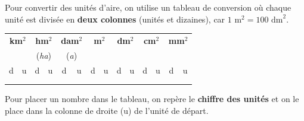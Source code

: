 \documentclass[a4paper]{book}
\begin{document}
    
    \begin{propriete}
        Pour convertir des unités d'aire, on utilise un tableau de conversion où chaque unité est divisée en \textbf{deux colonnes} (unités et dizaines), car $1 \text{ m}^2 = 100 \text{ dm}^2$.
        
        \begin{center}
        \renewcommand{\arraystretch}{1.5}
        \small
        \begin{tabular}{|c|c|c|c|c|c|c|c|c|c|c|c|c|c|}
        \hline
        \multicolumn{2}{|c|}{\textbf{km}$^2$} & \multicolumn{2}{c|}{\textbf{hm}$^2$} & \multicolumn{2}{c|}{\textbf{dam}$^2$} & \multicolumn{2}{c|}{\textbf{m}$^2$} & \multicolumn{2}{c|}{\textbf{dm}$^2$} & \multicolumn{2}{c|}{\textbf{cm}$^2$} & \multicolumn{2}{c|}{\textbf{mm}$^2$} \\
        \multicolumn{2}{|c|}{} & \multicolumn{2}{c|}{(\textit{ha})} & \multicolumn{2}{c|}{(\textit{a})} & \multicolumn{2}{c|}{} & \multicolumn{2}{c|}{} & \multicolumn{2}{c|}{} & \multicolumn{2}{c|}{} \\
        \hline
        d & u & d & u & d & u & d & u & d & u & d & u & d & u \\
        \hline
          &   &   &   &   &   &   &   &   &   &   &   &   &   \\
          &   &   &   &   &   &   &   &   &   &   &   &   &   \\
        \hline
        \end{tabular}
        \end{center}
    \end{propriete}
    
    
    \begin{methode}
        Pour placer un nombre dans le tableau, on repère le \textbf{chiffre des unités} et on le place dans la colonne de droite (u) de l'unité de départ.
    \end{methode}
    
\end{document}
